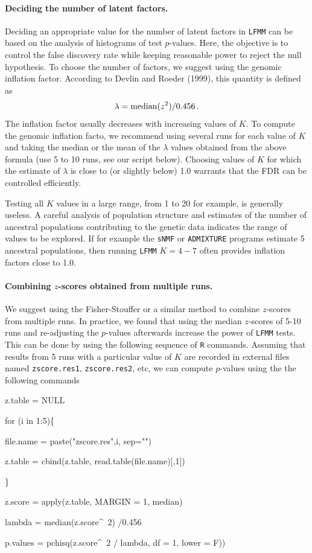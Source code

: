 \documentclass[10pt,a4paper]{article}
\begin{document}
\paragraph{Deciding the number of latent factors.} Deciding an appropriate value for the number of latent factors in {\tt LFMM} can be based on the analysis of histograms of test $p$-values. Here, the objective is to control the false discovery rate while keeping reasonable power to reject the null hypothesis.  To choose the number of factors, we suggest using the genomic inflation factor. According to Devlin and Roeder (1999), this quantity is defined  as 
$$
\lambda = {\rm median}( z^2 ) /0.456 \, . 
$$
The inflation factor usually decreases with increasing values of $K$. To compute the genomic inflation facto, we recommend using several runs for each value of $K$ and taking the median or the mean of the  $\lambda$ values obtained from the above formula (use 5 to 10 runs, see our script below).  Choosing values of $K$ for which the estimate of $\lambda$ is close to (or slightly below) 1.0 warrants that the FDR can be controlled efficiently. 

Testing all $K$ values in a large range, from 1 to 20 for example,  is generally useless. A careful analysis of population structure and estimates of the number of ancestral populations contributing to the genetic data indicates the range of values to be explored. If for example the {\tt sNMF} or {\tt ADMIXTURE} programs estimate 5 ancestral populations, then running {\tt LFMM} $K = 4-7$ often provides inflation factors close to 1.0.  

\paragraph{Combining $z$-scores obtained from multiple runs.}  We suggest using the Fisher-Stouffer or a similar method to combine $z$-scores from multiple runs. In practice, we found that using the median $z$-scores of 5-10 runs and re-adjusting the $p$-values afterwards increase the power of {\tt LFMM} tests. This can be done by using the following sequence of {\tt R} commands. Assuming that results from 5 runs with a particular value of $K$ are recorded in external files named {\tt zscore.res1}, {\tt zscore.res2}, etc, we can compute $p$-values using the the following commands   
{\tt 

z.table = NULL

for (i in 1:5)\{ 
 
file.name = paste("zscore.res",i, sep="")

z.table = cbind(z.table, read.table(file.name)[,1])

\}
    
z.score = apply(z.table, MARGIN = 1, median)
      
lambda = median(z.score\^~2) /0.456

p.values = pchisq(z.score\^~2 / lambda, df = 1, lower = F))

}        
                        
\end{document}

